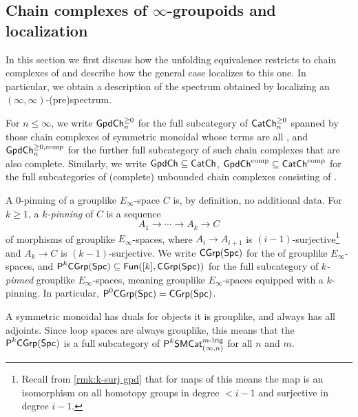 \documentclass[a4paper,11pt]{article}
\begin{document}
\subsection{Chain complexes of $\infty$-groupoids and localization}
\label{sec:gpdchcx}

In this section we first discuss how the unfolding equivalence
restricts to chain complexes of \igpds{} and describe how the general
case localizes to this one. In particular, we obtain a description of
the spectrum obtained by localizing an $(\infty,\infty)$-(pre)spectrum.

\begin{defn}
  For $n \leq \infty$, we write $\GpdChp_{n}$ for the full subcategory
  of $\CChp_{n}$ spanned by those chain complexes of symmetric
  monoidal \icats{} whose terms are all \igpds{}, and $\GpdChpc_{n}$
  for the further full subcategory of such chain complexes that are
  also complete. Similarly, we write $\GpdCh \subseteq \CCh$, $\GpdChc
  \subseteq \CChc$ for the full subcategories of (complete) unbounded
  chain complexes consisting of \igpds{}.
\end{defn}

\begin{defn}
  A $0$-pinning of a grouplike $E_{\infty}$-space $C$ is, by
  definition, no additional data.  For $k\geq1$, a
  \emph{$k$-pinning} of $C$ is a
  sequence
  \[ A_{1} \to \cdots \to A_{k} \to C\] of morphisms of grouplike
  $E_{\infty}$-spaces, where $A_{i} \to A_{i+1}$ is
  $(i-1)$-surjective\footnote{Recall from \cref{rmk:k-surj gpd} that
    for maps of \igpds{} this means the map is an isomorphism on all
    homotopy groups in degree $< i-1$ and surjective in degree $i-1$.}
  and $A_{k} \to C$ is $(k-1)$-surjective.  We write $\CGrp(\Spc)$ for
  the \icat{} of grouplike $E_{\infty}$-spaces, and
  $\PCGrp[k] \subseteq \Fun([k], \CGrp(\Spc))$ for the full
  subcategory of \emph{$k$-pinned} grouplike $E_{\infty}$-spaces,
  meaning grouplike $E_{\infty}$-spaces equipped with a $k$-pinning.
  In particular, $\PCGrp[0]=\CGrp(\Spc)$.
\end{defn}

\begin{observation}
  A symmetric monoidal \igpd{} has duals for objects \IFF{} it is
  grouplike, and always has all adjoints. Since loop spaces are always
  grouplike, this means that the \icat{}
  $\PCGrp[k]$ is a full subcategory of $\PSMCatIn[k]^{m\dlrig}$ for
  all $n$ and $m$.
\end{observation}
\end{document}
